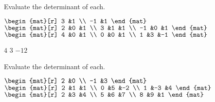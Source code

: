 \begin{exercises}
  \recommended \item 
     Evaluate the determinant of each.
     \begin{exparts*}
       \partsitem \(
            \begin{mat}[r]
                3    &1   \\
               -1    &1
            \end{mat}    \)
       \partsitem \(
            \begin{mat}[r]
                2    &0   &1  \\
                3    &1   &1 \\
               -1    &0   &1
            \end{mat}    \)
       \partsitem \(
            \begin{mat}[r]
                4    &0   &1  \\
                0    &0   &1 \\
                1    &3   &-1
            \end{mat}    \)
     \end{exparts*}
     \begin{answer}
       \begin{exparts*}
         \partsitem \( 4 \)
         \partsitem \( 3 \)
         \partsitem \( -12 \)
       \end{exparts*}  
     \end{answer}
  \item 
     Evaluate the determinant of each.
     \begin{exparts*}
        \partsitem \( \begin{mat}[r]
                    2  &0  \\
                   -1  &3
                 \end{mat} \)
        \partsitem \( \begin{mat}[r]
                    2  &1  &1  \\
                    0  &5  &-2 \\
                    1  &-3 &4
                 \end{mat} \)
        \partsitem \( \begin{mat}[r]
                    2  &3  &4  \\
                    5  &6  &7  \\
                    8  &9  &1
                 \end{mat} \)
     \end{exparts*}

\end{exercises}

